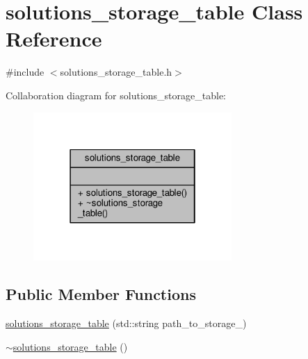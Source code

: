 \hypertarget{classsolutions__storage__table}{\section{solutions\-\_\-storage\-\_\-table Class Reference}
\label{classsolutions__storage__table}
}


{\ttfamily \#include $<$solutions\-\_\-storage\-\_\-table.\-h$>$}



Collaboration diagram for solutions\-\_\-storage\-\_\-table\-:\nopagebreak
\begin{figure}[H]
\begin{center}
\leavevmode
\includegraphics[width=214pt]{classsolutions__storage__table__coll__graph}
\end{center}
\end{figure}
\subsection*{Public Member Functions}
\begin{DoxyCompactItemize}
\item 
\hyperlink{classsolutions__storage__table_a82c00fa1e846e5ca2cfaffa3c7c9de3c}{solutions\-\_\-storage\-\_\-table} (std\-::string path\-\_\-to\-\_\-storage\-\_\-)
\item 
\hyperlink{classsolutions__storage__table_a46cb135ed1e0f2d825463bb92846704c}{$\sim$solutions\-\_\-storage\-\_\-table} ()
\end{DoxyCompactItemize}


